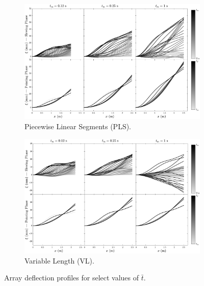 \begin{figure}[p]
    \centering
    \begin{subfigure}[b]{0.85\textwidth}
      \centering
      \includegraphics[width=\textwidth]{../ch7/figures/DisplacementPLS.pdf}
      \caption{Piecewise Linear Segments (PLS).}\label{fig:ch7:displacement_pls}
    \end{subfigure}
    \begin{subfigure}[b]{0.85\textwidth}
      \centering
      \includegraphics[width=\textwidth]{../ch7/figures/DisplacementVL.pdf}
      \caption{Variable Length (VL).}\label{fig:ch7:displacement_vl}
    \end{subfigure}
    \caption{Array deflection profiles for select values of $\bar{t}$.\label{fig:ch7:displacement}}
\end{figure}